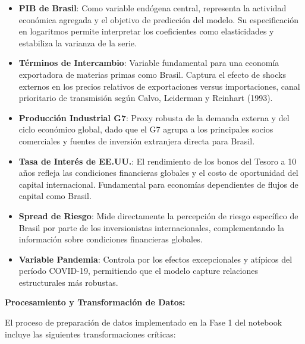 \documentclass[3p,11pt]{elsarticle}
\begin{document}
\begin{itemize}
    \item \textbf{PIB de Brasil}: Como variable endógena central, representa la actividad económica agregada y el objetivo de predicción del modelo. Su especificación en logaritmos permite interpretar los coeficientes como elasticidades y estabiliza la varianza de la serie.
    
    \item \textbf{Términos de Intercambio}: Variable fundamental para una economía exportadora de materias primas como Brasil. Captura el efecto de shocks externos en los precios relativos de exportaciones versus importaciones, canal prioritario de transmisión según Calvo, Leiderman y Reinhart (1993).
    
    \item \textbf{Producción Industrial G7}: Proxy robusta de la demanda externa y del ciclo económico global, dado que el G7 agrupa a los principales socios comerciales y fuentes de inversión extranjera directa para Brasil.
    
    \item \textbf{Tasa de Interés de EE.UU.}: El rendimiento de los bonos del Tesoro a 10 años refleja las condiciones financieras globales y el costo de oportunidad del capital internacional. Fundamental para economías dependientes de flujos de capital como Brasil.
    
    \item \textbf{Spread de Riesgo}: Mide directamente la percepción de riesgo específico de Brasil por parte de los inversionistas internacionales, complementando la información sobre condiciones financieras globales.
    
    \item \textbf{Variable Pandemia}: Controla por los efectos excepcionales y atípicos del período COVID-19, permitiendo que el modelo capture relaciones estructurales más robustas.
\end{itemize}

\textbf{Procesamiento y Transformación de Datos:}

El proceso de preparación de datos implementado en la Fase 1 del notebook incluye las siguientes transformaciones críticas:
\end{document}
